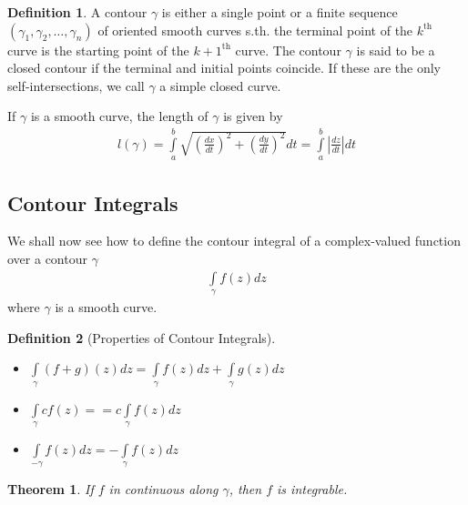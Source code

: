 \documentclass[12pt, a4paper]{article}
\theoremstyle{plain}
\newtheorem{thm}{Theorem} %
\theoremstyle{definition}
\newtheorem{definition}{Definition} %
\begin{document}
		\begin{definition}
			A contour $\gamma$ is either a single point or a finite sequence $(\gamma_1,\gamma_2,\ldots,\gamma_n)$ of oriented smooth curves s.th. the terminal point of the $k^{\mathrm{th}}$ curve is the starting point of the $k+1^{\mathrm{th}}$ curve. The contour $\gamma$ is said to be a closed contour if the terminal and initial points coincide. If these are the only self-intersections, we call $\gamma$ a simple closed curve.
		\end{definition}

		If $\gamma$ is a smooth curve, the length of $\gamma$ is given by
		\begin{align*}
			l(\gamma) = 
			\int\limits_{a}^{b}\sqrt{\left(\frac{dx}{dt}\right)^2+\left(\frac{dy}{dt}\right)^2}dt = 
			\int\limits_{a}^{b}\left|\frac{dz}{dt}\right| dt
		\end{align*}

		\subsection{Contour Integrals} %
		\label{sub:contour_integrals}
			We shall now see how to define the contour integral of a complex-valued function over a contour $\gamma$
			\begin{align*}
				\int\limits_{\gamma}f(z)dz
			\end{align*}
			where $\gamma$ is a  smooth curve.\\

			\begin{definition}[Properties of Contour Integrals]
			~\\
				\begin{itemize}
					\item $\displaystyle\int\limits_{\gamma}(f+g)(z)dz = \int\limits_{\gamma}f(z)dz + \int\limits_{\gamma}g(z)dz$
					\item $\displaystyle\int\limits_{\gamma}cf(z) = = c\int\limits_{\gamma}f(z)dz$
					\item $\displaystyle\int\limits_{-\gamma}f(z)dz = -\int\limits_{\gamma}f(z)dz$\\
				\end{itemize}
			\end{definition}

			\begin{thm}
				If $f$ in continuous along $\gamma$, then $f$ is integrable.
			\end{thm}
\end{document}

